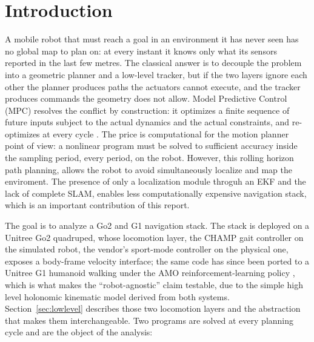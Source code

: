 \documentclass[11pt,a4paper]{article}
\begin{document}


\tableofcontents
\vspace{10pt}

\section{Introduction}
\label{sec:intro}

A mobile robot that must reach a goal in an environment it has never seen has no global map to plan on: at
every instant it knows only what its sensors reported in the last few metres. The classical answer is to
decouple the problem into a geometric planner and a low-level tracker, but if the two layers ignore each
other the planner produces paths the actuators cannot execute, and the tracker produces commands the geometry
does not allow. Model Predictive Control (MPC) resolves the conflict by construction: it optimizes a finite
sequence of future inputs subject to the actual dynamics and the actual constraints, and re-optimizes at every
cycle \cite{rawlings2017mpc}. The price is computational for the motion planner point of view: a nonlinear program must be solved to sufficient
accuracy inside the sampling period, every period, on the robot. However, this rolling horizon path planning, allows the robot to avoid simultaneously localize and map the enviroment. The presence of only a localization module throguh an EKF and the lack of complete SLAM, enables less computationally expensive navigation stack, which is an important contribution of this report.

The goal is to analyze a Go2 and G1 navigation stack. The stack is deployed on a Unitree Go2
quadruped, whose locomotion layer, the CHAMP gait controller \cite{champ} on the simulated robot, the
vendor's sport-mode controller on the physical one, exposes a body-frame velocity interface; the same code
has since been ported to a Unitree G1 humanoid walking under the AMO reinforcement-learning policy
\cite{li2025amo}, which is what makes the ``robot-agnostic'' claim testable, due to the simple high level
holonomic kinematic model derived from both systems. Section~\ref{sec:lowlevel} describes those two
locomotion layers and the abstraction that makes them interchangeable. Two programs are
solved at every planning cycle and are the object of the analysis:
\end{document}
